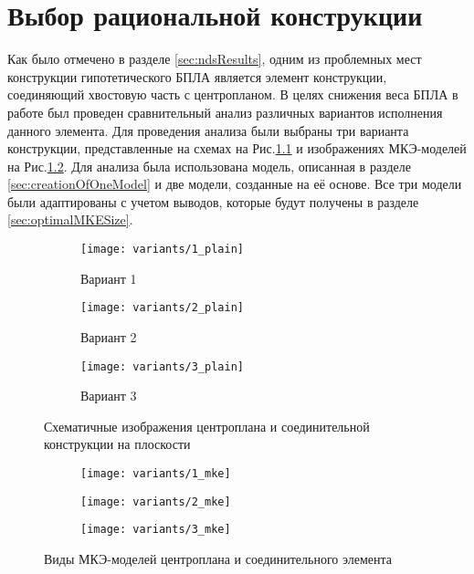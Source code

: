 
\chapter{Выбор рациональной конструкции}
Как было отмечено в разделе \ref{sec:ndsResults}, одним из проблемных мест конструкции гипотетического БПЛА является элемент конструкции, соединяющий хвостовую часть с центропланом. В целях снижения веса БПЛА в работе был проведен сравнительный анализ различных вариантов исполнения данного элемента. Для проведения анализа были выбраны три варианта конструкции, представленные на схемах на Рис.\ref{fig:variants_plain} и изображениях МКЭ-моделей на Рис.\ref{fig:variants_mke}. Для анализа была использована модель, описанная в разделе \ref{sec:creationOfOneModel} и две модели, созданные на её основе. Все три модели были адаптированы с учетом выводов, которые будут получены в разделе \ref{sec:optimalMKESize}.  

\begin{figure}[H]
\centering
\begin{subfigure}[b]{0.32\textwidth}
\centering
	\texttt{[image: variants/1\_plain]}
	\caption{Вариант 1}
\end{subfigure}
\hspace{\fill}
\begin{subfigure}[b]{0.32\textwidth}
\centering
	\texttt{[image: variants/2\_plain]}
	\caption{Вариант 2}
\end{subfigure}
\hspace{\fill}
\begin{subfigure}[b]{0.32\textwidth}
\centering
	\texttt{[image: variants/3\_plain]}
	\caption{Вариант 3}
\end{subfigure}
\hspace{\fill}
\caption{Схематичные изображения центроплана и соединительной конструкции на плоскости}
\label{fig:variants_plain}
\end{figure}	


\begin{figure}[H]
\centering
\begin{subfigure}[b]{0.32\textwidth}
	\texttt{[image: variants/1\_mke]}
\end{subfigure}
\hspace{\fill}
\begin{subfigure}[b]{0.32\textwidth}
	\texttt{[image: variants/2\_mke]}
\end{subfigure}
\hspace{\fill}
\begin{subfigure}[b]{0.32\textwidth}
	\texttt{[image: variants/3\_mke]}
\end{subfigure}
\hspace{\fill}
\caption{Виды МКЭ-моделей центроплана и соединительного элемента}
\label{fig:variants_mke}
\end{figure}	



